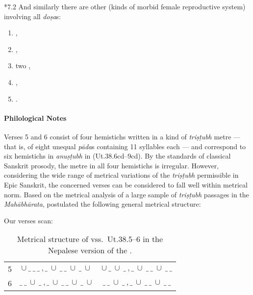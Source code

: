 \begin{translation}
\item [*7.2] And similarly there are other (kinds of morbid female reproductive 
system) involving all \emph{doṣa}s:
\begin{enumerate}
    \item {},
    \item {},
    \item two ,
    \item {},
    \item {}.
\end{enumerate}
\end{translation}

\paragraph*{Philological Notes}
Verses 5 and 6 consist of four hemistichs written in a kind of \textit{triṣṭubh} 
metre --- that is, of eight unequal \textit{pāda}s containing 11 syllables each --- 
and correspond to six hemistichs in \textit{anuṣṭubh} in \cite{vulgate} 
(Ut.38.6cd--9cd).
By the standards of classical Sanskrit prosody, the metre in all four hemistichs is 
irregular. However, considering the wide range of metrical variations of the 
\textit{triṣṭubh} permissible in Epic Sanskrit, the concerned verses can be 
considered to fall well within metrical norm. Based on the metrical analysis of a 
large sample of \textit{triṣṭubh} passages in the \textit{Mahābhārata}, 
\textcite[108]{fitz-2009} postulated the following general metrical structure: 

\begin{table}[h!]
\centering
\caption{\small Summary of table 3 in \cite{fitz-2009}.}
\end{table}

Our verses scan:

\begin{table}[h!]
\centering
\caption{\small Metrical structure of vss.\ Ut.38.5--6 in the Nepalese version of the 
\SS.}
\begin{tabular}{ c || c | c }
    5 & $\cup\ \_\ \_\ \_\ , \_\ \cup\ \_\ \_\ \cup\ \_\ \cup$ & $\cup\ \_\ \cup\ \_\ , \_\ \cup\  
    \_\ \_\ \cup\ \_\ \_$ \\ 
    6 & $\_\ \_\ \cup\ \_\ , \_\ \cup\ \_\ \_\ \cup\ \_\ \cup$ & $\_\ \_\ \cup\ \_\ , \_\ \cup\ \_\ 
    \_\ \cup\ \_\ \_$     
\end{tabular}
\end{table}

